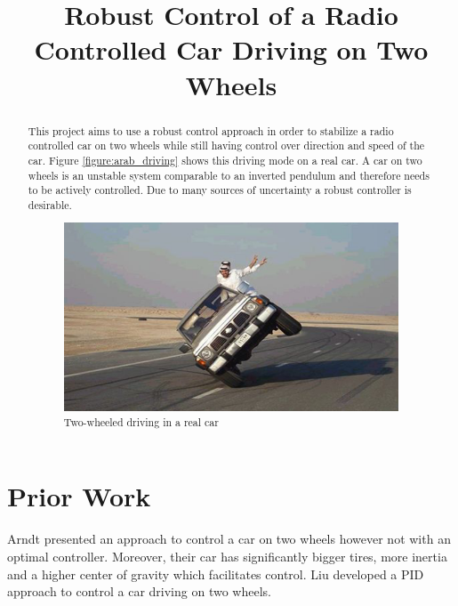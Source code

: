 \documentclass[conference]{IEEEtran}
\begin{document}
\title{Robust Control of a Radio Controlled Car Driving on Two Wheels }


\author{
}

\maketitle

\begin{abstract}
This project aims to use a robust control approach in order to stabilize a radio controlled car on two wheels while still having control over direction and speed of the car. Figure \ref{figure:arab_driving} shows this driving mode on a real car. A car on two wheels is an unstable system comparable to an inverted pendulum and therefore needs to be actively controlled. Due to many sources of uncertainty a robust controller is desirable.

\begin{figure}[h]
\centering
  \includegraphics[width=.47\textwidth]{pics/drivesensibly.png} 
  \caption{Two-wheeled driving in a real car}  
  \label{figure:arab_driving}
\end{figure}

\end{abstract}


\section{Prior Work}

Arndt \cite{bib:arndt} presented an approach to control a car on two wheels however not with an optimal controller. Moreover, their car has significantly bigger tires, more inertia and a higher center of gravity which facilitates control. Liu \cite{bib:liu} developed a PID approach to control a car driving on two wheels.
\end{document}
